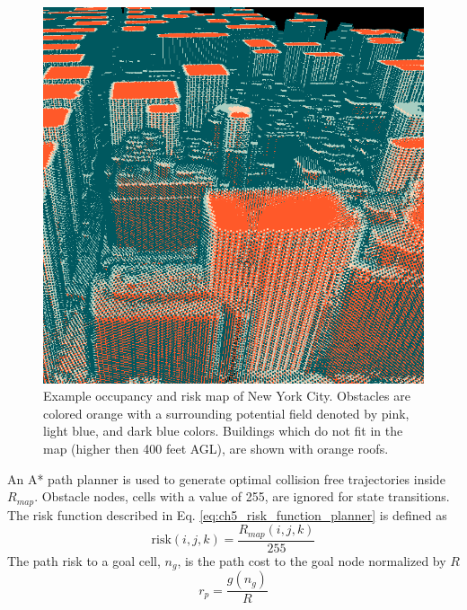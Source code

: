 \begin{figure}[ht]
  \centering
  \includegraphics[width=0.5\linewidth]{chapter_5_mapping/imgs/voxel_map_ny_2.png}
  \caption[Example occupancy and risk map of New York City]{Example occupancy and risk map of New York City. Obstacles are colored orange with a surrounding potential field denoted by pink, light blue, and dark blue colors. Buildings which do not fit in the map (higher then 400 feet AGL), are shown with orange roofs.}
  \label{fig:ch5_ny_voxel_map}
\end{figure}

An A* path planner is used to generate optimal collision free trajectories inside $R_{map}$. Obstacle nodes, cells with a value of 255, are ignored for state transitions. The risk function described in Eq. \ref{eq:ch5_risk_function_planner} is defined as
\begin{equation}
\text{risk}(i,j,k) = \frac{R_{map}(i,j,k )}{255} 
\end{equation}
The path risk to a goal cell, $n_g$, is the path cost to the goal node normalized by $R$
\begin{equation}
r_p = \frac{g(n_g)}{R} 
\end{equation}





